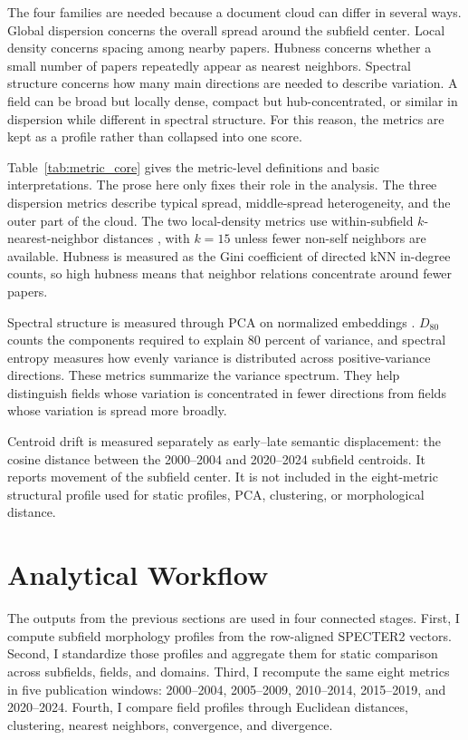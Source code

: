 

The four families are needed because a document cloud can differ in several ways. Global dispersion concerns the overall spread around the subfield center. Local density concerns spacing among nearby papers. Hubness concerns whether a small number of papers repeatedly appear as nearest neighbors. Spectral structure concerns how many main directions are needed to describe variation. A field can be broad but locally dense, compact but hub-concentrated, or similar in dispersion while different in spectral structure. For this reason, the metrics are kept as a profile rather than collapsed into one score.

Table~\ref{tab:metric_core} gives the metric-level definitions and basic interpretations. The prose here only fixes their role in the analysis. The three dispersion metrics describe typical spread, middle-spread heterogeneity, and the outer part of the cloud. The two local-density metrics use within-subfield \(k\)-nearest-neighbor distances \parencite{cover1967nearest}, with \(k=15\) unless fewer non-self neighbors are available. Hubness is measured as the Gini coefficient of directed kNN in-degree counts, so high hubness means that neighbor relations concentrate around fewer papers.

Spectral structure is measured through PCA on normalized embeddings \parencite{jolliffe2016pca}. \(D_{80}\) counts the components required to explain 80 percent of variance, and spectral entropy \parencite{shannon1948communication} measures how evenly variance is distributed across positive-variance directions. These metrics summarize the variance spectrum. They help distinguish fields whose variation is concentrated in fewer directions from fields whose variation is spread more broadly.

Centroid drift is measured separately as early--late semantic displacement: the cosine distance between the 2000--2004 and 2020--2024 subfield centroids. It reports movement of the subfield center. It is not included in the eight-metric structural profile used for static profiles, PCA, clustering, or morphological distance.

\section{Analytical Workflow}

The outputs from the previous sections are used in four connected stages. First, I compute subfield morphology profiles from the row-aligned SPECTER2 vectors. Second, I standardize those profiles and aggregate them for static comparison across subfields, fields, and domains. Third, I recompute the same eight metrics in five publication windows: 2000--2004, 2005--2009, 2010--2014, 2015--2019, and 2020--2024. Fourth, I compare field profiles through Euclidean distances, clustering, nearest neighbors, convergence, and divergence.

